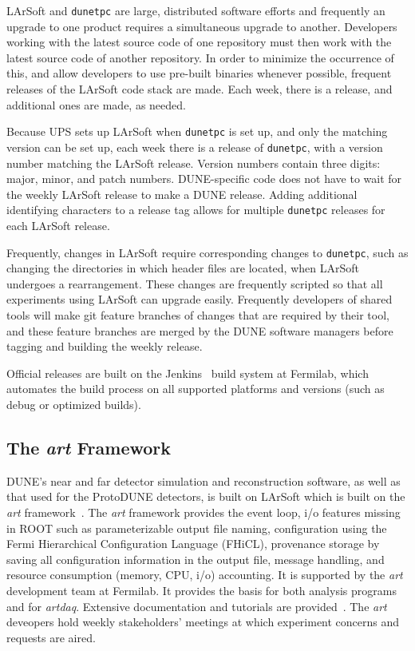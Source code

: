 LArSoft and {\tt dunetpc} are large, distributed software efforts and frequently an upgrade to one product
requires a simultaneous upgrade to another.  Developers working with the latest source code of one repository
must then work with the latest source code of another repository.  In order to minimize the occurrence of this,
and allow developers to use pre-built binaries whenever possible, frequent releases of the LArSoft code stack
are made.  Each week, there is a release, and additional ones are made, as needed.

Because UPS sets up LArSoft when {\tt dunetpc} is set up, and only the matching version can be set up,
each week there is a release of {\tt dunetpc}, with a version number matching the LArSoft release.  Version
numbers contain three digits: major, minor, and patch numbers.  DUNE-specific code does not have to wait
for the weekly LArSoft release to make a DUNE release.  Adding additional identifying characters to a release
tag allows for multiple {\tt dunetpc} releases for each LArSoft release.

Frequently, changes in LArSoft require corresponding changes to {\tt dunetpc}, such as changing the directories
in which header files are located, when LArSoft undergoes a rearrangement.  These changes are frequently scripted
so that all experiments using LArSoft can upgrade easily.  Frequently developers of shared tools will make git
feature branches of changes that are required by their tool, and these feature branches are merged by the
DUNE software managers before tagging and building the weekly release.

Official releases are built on the Jenkins~\cite{jenkins} build system at Fermilab, which automates the
build process on all supported platforms and versions (such as debug or optimized builds).

\subsection{The {\it art} Framework}

DUNE's near and far detector simulation and reconstruction software, as well as that used for the ProtoDUNE
detectors, is built on LArSoft which is built on the {\it art} framework~\cite{art}.  The {\it art} framework
provides the event loop, i/o features missing in ROOT such as parameterizable output file naming, configuration
using the Fermi Hierarchical Configuration Language (FHiCL), provenance storage by saving all configuration
information in the output file, message handling, and resource consumption (memory, CPU, i/o) accounting.  It
is supported by the {\it art} development team at Fermilab.  It provides the basis for both analysis programs
and for {\it artdaq}.  Extensive documentation and tutorials are provided~\cite{artdoc}\cite{arttutorial}.
The {\it art} deveopers hold weekly stakeholders' meetings at which experiment concerns and requests are aired.

